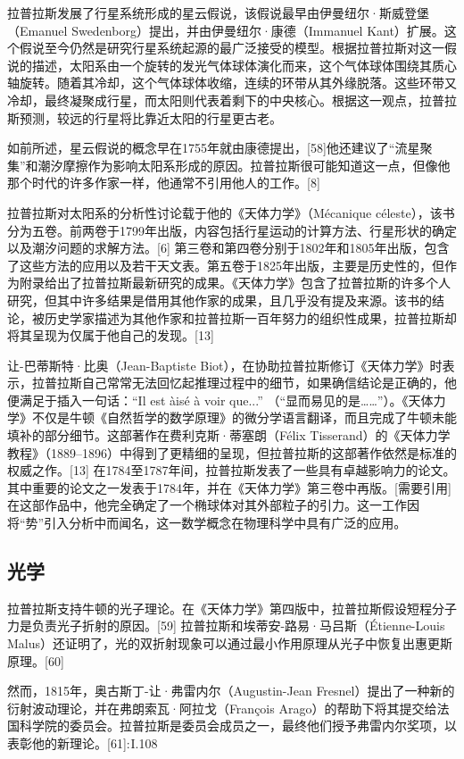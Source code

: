 拉普拉斯发展了行星系统形成的星云假说，该假说最早由伊曼纽尔·斯威登堡（Emanuel Swedenborg）提出，并由伊曼纽尔·康德（Immanuel Kant）扩展。这个假说至今仍然是研究行星系统起源的最广泛接受的模型。根据拉普拉斯对这一假说的描述，太阳系由一个旋转的发光气体球体演化而来，这个气体球体围绕其质心轴旋转。随着其冷却，这个气体球体收缩，连续的环带从其外缘脱落。这些环带又冷却，最终凝聚成行星，而太阳则代表着剩下的中央核心。根据这一观点，拉普拉斯预测，较远的行星将比靠近太阳的行星更古老。

如前所述，星云假说的概念早在1755年就由康德提出，[58]他还建议了“流星聚集”和潮汐摩擦作为影响太阳系形成的原因。拉普拉斯很可能知道这一点，但像他那个时代的许多作家一样，他通常不引用他人的工作。[8]

拉普拉斯对太阳系的分析性讨论载于他的《天体力学》（Mécanique céleste），该书分为五卷。前两卷于1799年出版，内容包括行星运动的计算方法、行星形状的确定以及潮汐问题的求解方法。[6] 第三卷和第四卷分别于1802年和1805年出版，包含了这些方法的应用以及若干天文表。第五卷于1825年出版，主要是历史性的，但作为附录给出了拉普拉斯最新研究的成果。《天体力学》包含了拉普拉斯的许多个人研究，但其中许多结果是借用其他作家的成果，且几乎没有提及来源。该书的结论，被历史学家描述为其他作家和拉普拉斯一百年努力的组织性成果，拉普拉斯却将其呈现为仅属于他自己的发现。[13]

让-巴蒂斯特·比奥（Jean-Baptiste Biot），在协助拉普拉斯修订《天体力学》时表示，拉普拉斯自己常常无法回忆起推理过程中的细节，如果确信结论是正确的，他便满足于插入一句话：“Il est àisé à voir que...” （“显而易见的是……”）。《天体力学》不仅是牛顿《自然哲学的数学原理》的微分学语言翻译，而且完成了牛顿未能填补的部分细节。这部著作在费利克斯·蒂塞朗（Félix Tisserand）的《天体力学教程》（1889–1896）中得到了更精细的呈现，但拉普拉斯的这部著作依然是标准的权威之作。[13] 在1784至1787年间，拉普拉斯发表了一些具有卓越影响力的论文。其中重要的论文之一发表于1784年，并在《天体力学》第三卷中再版。[需要引用] 在这部作品中，他完全确定了一个椭球体对其外部粒子的引力。这一工作因将“势”引入分析中而闻名，这一数学概念在物理科学中具有广泛的应用。
\subsection{光学}  
拉普拉斯支持牛顿的光子理论。在《天体力学》第四版中，拉普拉斯假设短程分子力是负责光子折射的原因。[59] 拉普拉斯和埃蒂安-路易·马吕斯（Étienne-Louis Malus）还证明了，光的双折射现象可以通过最小作用原理从光子中恢复出惠更斯原理。[60]

然而，1815年，奥古斯丁-让·弗雷内尔（Augustin-Jean Fresnel）提出了一种新的衍射波动理论，并在弗朗索瓦·阿拉戈（François Arago）的帮助下将其提交给法国科学院的委员会。拉普拉斯是委员会成员之一，最终他们授予弗雷内尔奖项，以表彰他的新理论。[61]: I.108 
